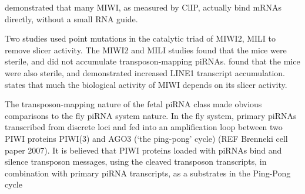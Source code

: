 \citet{Vourekas2012} demonstrated that many MIWI, as measured by ClIP, actually bind mRNAs directly, without a small RNA guide.

Two studies \citep{DeFazio2011,Reuter2011} used point mutations in the catalytic triad of MIWI2, MILI to remove slicer activity. The MIWI2 and MILI studies found that the mice were sterile, and did not accumulate transposon-mapping piRNAs. \citet{DeFazio2011} found that the mice were also sterile, and demonstrated increased LINE1 transcript accumulation.  \citet{Reuter2011} states that much the biological activity of MIWI depends on its slicer activity.

The transposon-mapping nature of the fetal piRNA class made obvious comparisons to the fly piRNA system nature. In the fly system, primary piRNAs transcribed from discrete loci and fed into an amplification loop between two PIWI proteins PIWI(3) and AGO3 (‘the ping-pong’ cycle) (REF Brenneki cell paper 2007). It is believed that PIWI proteins loaded with piRNAs bind and silence transposon messages, using the cleaved transposon transcripts, in combination with primary piRNA transcripts, as a substrates in the Ping-Pong cycle %




